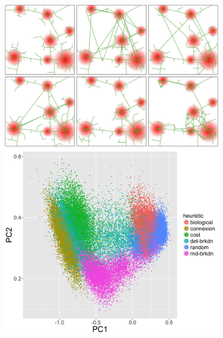 \documentclass[letterpaper]{article}
\begin{document}
\begin{figure}[h!]
\vspace{-0.5cm}
\begin{minipage}[c]{0.45\linewidth}
\includegraphics[width=\linewidth]{figures/7-1-2-fig-networkgrowth-examples.jpg}\\
\includegraphics[width=\linewidth]{figures/7-1-2-fig-networkgrowth-feasiblespace.jpg}\\
\end{minipage}
\begin{minipage}[c]{0.55\linewidth}

\end{minipage}
\end{figure}
\end{document}
